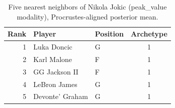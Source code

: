 \begin{table}[htbp]
  \centering\small
  \begin{tabular}{rllc}
    \toprule
    Rank & Player & Position & Archetype \\
    \midrule
    1 & Luka Doncic & G & 1 \\
    2 & Karl Malone & F & 1 \\
    3 & GG Jackson II & F & 1 \\
    4 & LeBron James & G & 1 \\
    5 & Devonte' Graham & G & 1 \\
    \bottomrule
  \end{tabular}
  \caption{Five nearest neighbors of Nikola Jokic (peak_value modality), Procrustes-aligned posterior mean.}
  \label{tab:Nikola_Jokic_neighbors_peak_value}
\end{table}

